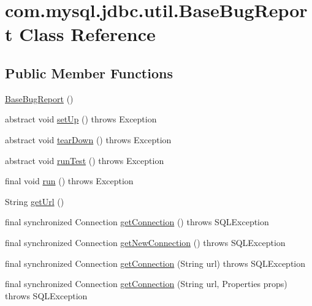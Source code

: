 \hypertarget{classcom_1_1mysql_1_1jdbc_1_1util_1_1_base_bug_report}{}\section{com.\+mysql.\+jdbc.\+util.\+Base\+Bug\+Report Class Reference}
\label{classcom_1_1mysql_1_1jdbc_1_1util_1_1_base_bug_report}
\subsection*{Public Member Functions}
\begin{DoxyCompactItemize}
\item 
\mbox{\hyperlink{classcom_1_1mysql_1_1jdbc_1_1util_1_1_base_bug_report_a886696416ed381d447df7e5ae81f974b}{Base\+Bug\+Report}} ()
\item 
abstract void \mbox{\hyperlink{classcom_1_1mysql_1_1jdbc_1_1util_1_1_base_bug_report_aad06cc210e16377a2837266b087ea2ce}{set\+Up}} ()  throws Exception
\item 
abstract void \mbox{\hyperlink{classcom_1_1mysql_1_1jdbc_1_1util_1_1_base_bug_report_a7fd16c03e3e8778c75cb64274e1349de}{tear\+Down}} ()  throws Exception
\item 
abstract void \mbox{\hyperlink{classcom_1_1mysql_1_1jdbc_1_1util_1_1_base_bug_report_ad870550c2d0f04bc0286066d8d8ebe5f}{run\+Test}} ()  throws Exception
\item 
final void \mbox{\hyperlink{classcom_1_1mysql_1_1jdbc_1_1util_1_1_base_bug_report_ab8d6a080a34fed2a99c651d1d5870eb1}{run}} ()  throws Exception 
\item 
String \mbox{\hyperlink{classcom_1_1mysql_1_1jdbc_1_1util_1_1_base_bug_report_a99f7e2402d349f45c11a4cd09ba4f62a}{get\+Url}} ()
\item 
final synchronized Connection \mbox{\hyperlink{classcom_1_1mysql_1_1jdbc_1_1util_1_1_base_bug_report_a71060585627222c1d40f6cae3b2e9542}{get\+Connection}} ()  throws S\+Q\+L\+Exception 
\item 
final synchronized Connection \mbox{\hyperlink{classcom_1_1mysql_1_1jdbc_1_1util_1_1_base_bug_report_a913aef6f4516678c2d67bba169b32fae}{get\+New\+Connection}} ()  throws S\+Q\+L\+Exception 
\item 
final synchronized Connection \mbox{\hyperlink{classcom_1_1mysql_1_1jdbc_1_1util_1_1_base_bug_report_ab8d73bffa10b18d975d64bde434fe4b7}{get\+Connection}} (String url)  throws S\+Q\+L\+Exception 
\item 
final synchronized Connection \mbox{\hyperlink{classcom_1_1mysql_1_1jdbc_1_1util_1_1_base_bug_report_a23d83d1297142eb136a1898cb339b77a}{get\+Connection}} (String url, Properties props)  throws S\+Q\+L\+Exception 
\end{DoxyCompactItemize}
